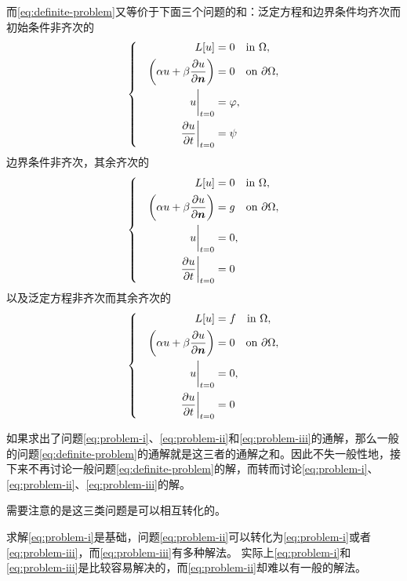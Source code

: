 \documentclass[UTF8]{ctexart}
\newenvironment{bigcase}{\left\{ \quad \begin{aligned}}{\end{aligned}\right.}
\begin{document}
而\eqref{eq:definite-problem}又等价于下面三个问题的和：泛定方程和边界条件均齐次而初始条件非齐次的
\begin{equation}
    \begin{bigcase}
        L[u] &= 0 \quad \text{in $\Omega$}, \\
        \left(\alpha u + \beta \pdv{u}{\vb*{n}} \right) &= 0 \quad \text{on $\partial \Omega$}, \\
        \eval{u}_{t=0} &= \varphi, \\
        \eval{\pdv{u}{t}}_{t=0} &= \psi
    \end{bigcase}
    \label{eq:problem-i}
\end{equation}
边界条件非齐次，其余齐次的
\begin{equation}
    \begin{bigcase}
        L[u] &= 0 \quad \text{in $\Omega$}, \\
        \left(\alpha u + \beta \pdv{u}{\vb*{n}} \right) &= g \quad \text{on $\partial \Omega$}, \\
        \eval{u}_{t=0} &= 0, \\
        \eval{\pdv{u}{t}}_{t=0} &= 0
    \end{bigcase}
    \label{eq:problem-ii}
\end{equation}
以及泛定方程非齐次而其余齐次的
\begin{equation}
    \begin{bigcase}
        L[u] &= f \quad \text{in $\Omega$}, \\
        \left(\alpha u + \beta \pdv{u}{\vb*{n}} \right) &= 0 \quad \text{on $\partial \Omega$}, \\
        \eval{u}_{t=0} &= 0, \\
        \eval{\pdv{u}{t}}_{t=0} &= 0
    \end{bigcase}
    \label{eq:problem-iii}
\end{equation}

如果求出了问题\eqref{eq:problem-i}、\eqref{eq:problem-ii}和\eqref{eq:problem-iii}的通解，那么一般的问题\eqref{eq:definite-problem}的通解就是这三者的通解之和。因此不失一般性地，接下来不再讨论一般问题\eqref{eq:definite-problem}的解，而转而讨论\eqref{eq:problem-i}、\eqref{eq:problem-ii}、\eqref{eq:problem-iii}的解。

需要注意的是这三类问题是可以相互转化的。

求解\eqref{eq:problem-i}是基础，问题\eqref{eq:problem-ii}可以转化为\eqref{eq:problem-i}或者\eqref{eq:problem-iii}，而\eqref{eq:problem-iii}有多种解法。
实际上\eqref{eq:problem-i}和\eqref{eq:problem-iii}是比较容易解决的，而\eqref{eq:problem-ii}却难以有一般的解法。
\end{document}
